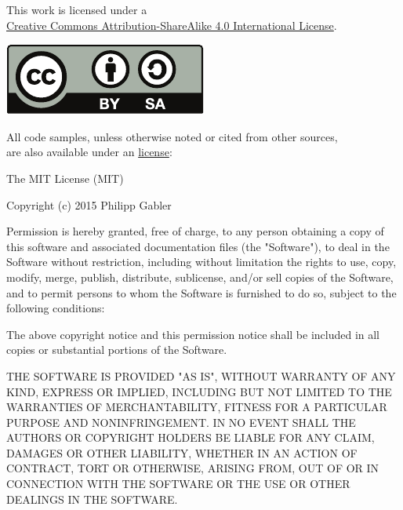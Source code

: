 \documentclass[11pt,a4paper,oneside]{memoir}
\begin{document}
\movetoevenpage
\begin{adjustwidth}{\absleftindent}{\absrightindent}
  \label{license}

  \abstracttextfont
  \begin{center}
    This work is licensed under a \\ \href{http://creativecommons.org/licenses/by-sa/4.0/}{Creative
      Commons Attribution-ShareAlike 4.0 International License}.
  \end{center}
  \begin{center}
    \includegraphics[scale=1]{fig/by-sa}
  \end{center}
  \begin{center}
    All code samples, unless otherwise noted or cited from other sources, \\ are also available under an
    \href{http://opensource.org/licenses/MIT}{ license}:
  \end{center}
  \vspace*{-1ex}
  \begin{ttfamily}
    \setlength{\parskip}{12pt}
    \setlength{\parindent}{0pt}
    The MIT License (MIT)

    Copyright (c) 2015 Philipp Gabler

    Permission is hereby granted, free of charge, to any person obtaining a copy of this software
    and associated documentation files (the "Software"), to deal in the Software without
    restriction, including without limitation the rights to use, copy, modify, merge, publish,
    distribute, sublicense, and/or sell copies of the Software, and to permit persons to whom the
    Software is furnished to do so, subject to the following conditions:

    The above copyright notice and this permission notice shall be included in all copies or
    substantial portions of the Software.

    THE SOFTWARE IS PROVIDED "AS IS", WITHOUT WARRANTY OF ANY KIND, EXPRESS OR IMPLIED, INCLUDING
    BUT NOT LIMITED TO THE WARRANTIES OF MERCHANTABILITY, FITNESS FOR A PARTICULAR PURPOSE AND
    NON\-IN\-FRINGE\-MENT. IN NO EVENT SHALL THE AUTHORS OR COPYRIGHT HOLDERS BE LIABLE FOR ANY
    CLAIM, DAMAGES OR OTHER LIABILITY, WHETHER IN AN ACTION OF CONTRACT, TORT OR OTHERWISE, ARISING
    FROM, OUT OF OR IN CONNECTION WITH THE SOFTWARE OR THE USE OR OTHER DEALINGS IN THE SOFTWARE.
  \end{ttfamily}
  

\end{adjustwidth}
\end{document}
